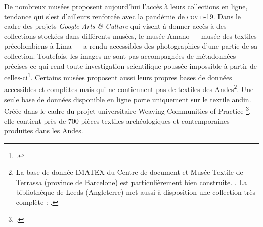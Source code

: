 De nombreux musées proposent aujourd'hui l'accès à leurs collections en ligne, tendance qui s'est d'ailleurs renforcée avec la pandémie de \textsc{covid-}\small 19\normalsize. Dans le cadre des projets \textit{Google Arts \& Culture} qui visent à donner accès à des collections stockées dans différents musées, le musée Amano --- musée des textiles précolombiens à Lima --- a rendu accessibles des photographies d'une partie de sa collection. Toutefois, les images ne sont pas accompagnées de métadonnées précises ce qui rend toute investigation scientifique poussée impossible à partir de celles-ci\footcite{AmanoPreColumbianTextile}. Certains musées proposent aussi leurs propres bases de données accessibles et complètes mais qui ne contiennent pas de textiles des Andes\footnote{La base de donnée IMATEX du Centre de document et Musée Textile de Terrassa (province de Barcelone) est particulièrement bien construite. \cite{Imatex}. La bibliothèque de Leeds (Angleterre) met aussi à disposition une collection très complète : \cite{InternationalTextileCollection}.}. Une seule base de données disponible en ligne porte uniquement sur le textile andin. Créée dans le cadre du projet universitaire \og Weaving Communities of Practice \fg\footcite{FrontPageWeaving}, elle contient près de 700 pièces textiles archéologiques et contemporaines produites dans les Andes. 
